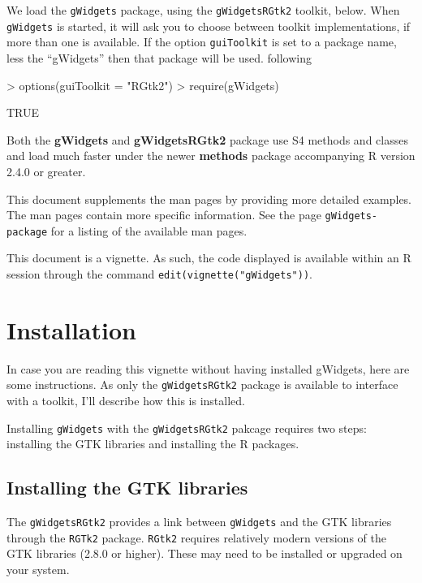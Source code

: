 \documentclass[12pt]{article}
\newcommand{\RCode}[1]{\texttt{#1}}
\newcommand{\RPackage}[1]{\textbf{#1}}
\begin{document}
We  load the \RCode{gWidgets} package, using the \RCode{gWidgetsRGtk2}
toolkit, below. When \RCode{gWidgets} is started, it will ask you to choose
between toolkit implementations, if more than one is available. If the
option \RCode{guiToolkit} is set to a package name, less the
``gWidgets'' then that package will be used. 
following 
\begin{Schunk}
\begin{Sinput}
> options(guiToolkit = "RGtk2")
> require(gWidgets)
\end{Sinput}
\begin{Soutput}
[1] TRUE
\end{Soutput}
\end{Schunk}


Both the \RPackage{gWidgets} and \RPackage{gWidgetsRGtk2} package use
S4 methods and classes and load much faster under the newer
\RPackage{methods} package accompanying R version 2.4.0 or greater.

This document supplements the man pages by providing more detailed
examples. The man pages contain more specific information. See the 
page \RCode{gWidgets-package} for a listing of the available man pages.

This document is a vignette. As such, the code displayed is available
within an R session through the command
\RCode{edit(vignette("gWidgets"))}. 


\section{Installation}
In case you are reading this vignette without having installed
gWidgets, here are some instructions. As only the
\RCode{gWidgetsRGtk2} package is available to interface with a
toolkit, I'll describe how this is installed.

Installing \RCode{gWidgets} with the \RCode{gWidgetsRGtk2} pakcage
requires two steps: installing the GTK libraries and installing the R
packages.



\subsection{Installing the GTK libraries}

The \RCode{gWidgetsRGtk2} provides a link between \RCode{gWidgets} and
the GTK libraries through the \RCode{RGTk2} package.  \texttt{RGtk2}
requires relatively modern versions of the GTK libraries (2.8.0 or
higher). These may need to be installed or upgraded on your system.
\end{document}
